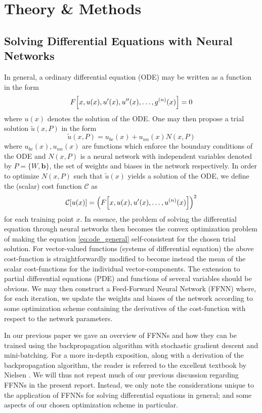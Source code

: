 \documentclass[reprint, english, nofootinbib]{revtex4-2}
\begin{document}
\section{Theory \& Methods}

\subsection{Solving Differential Equations with Neural Networks}
\noindent
In general, a ordinary differential equation (ODE) may be written as a function in the form
\begin{equation}
\label{eq:ode_general}
    F \qty[x, u(x), u'(x), u''(x), \dots, g^{(n)}(x)] = 0
\end{equation}    
where $u(x)$ denotes the solution of the ODE. One may then propose a trial solution $\tilde u(x,P)$ in the form
\begin{equation}
    \tilde u(x, P) = u_{bc}(x) + u_{nn}(x)N(x, P) 
\end{equation}
where $u_{bc}(x), u_{nn}(x)$ are functions which enforce the boundary conditions of the ODE and $N(x, P)$ is a neural network with independent variables denoted by $P = \{W, \pmb b\}$, the set of weights and biases in the network respectively. In order to optimize $N(x, P)$ such that $\tilde u(x)$ yields a solution of the ODE, we define the (scalar) cost function $\mathcal{C}$ as
\begin{equation}
    \mathcal C\qty[u\qty(x)] = \qty(F\qty[x, u(x), u'(x), \dots, u^{(n)}(x)])^2
\end{equation}
for each training point $x$. In essence, the problem of solving the differential equation through neural networks then becomes the convex optimization problem of making the equation \ref{eq:ode_general} self-consistent for the chosen trial solution. For vector-valued functions (systems of differential equation) the above cost-function is straightforwardly modified to become instead the mean of the scalar cost-functions for the individual vector-components. The extension to partial differential equations (PDE) and functions of several variables should be obvious. We may then construct a Feed-Forward Neural Network (FFNN) where, for each iteration, we update the weights and biases of the network according to some optimization scheme containing the derivatives of  the cost-function with respect to the network parameters. 

In our previous paper \citep{4155_project_2} we gave an overview of FFNNs and how they can be trained using the backpropagation algorithm with stochastic gradient descent and mini-batching. For a more in-depth exposition, along with a derivation of the backpropagation algorithm, the reader is referred to the excellent textbook by Nielsen \citep{Nielsen}. We will thus not repeat much of our previous discussion regarding FFNNs in the present report. Instead, we only note the considerations unique to the application of FFNNs for solving differential equations in general; and some aspects of our chosen optimization scheme in particular.
\end{document}
